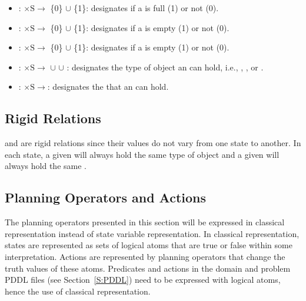 \begin{itemize}
\item {}: $\mathrm{\times S\rightarrow}$ \{0\} $\cup$ \{1\}: designates if a  is full (1) or not (0).

\item {}: $\mathrm{\times S\rightarrow}$ \{0\} $\cup$ \{1\}: designates if a  is empty (1) or not (0).

\item {}: $\mathrm{\times S\rightarrow}$ \{0\} $\cup$ \{1\}: designates if a  is empty (1) or not (0).

\item {}: $\mathrm{\times S \rightarrow}$ $\cup$  $\cup$ : designates the type of object an  can hold, i.e., , , or .

\item {}: $\mathrm{\times S \rightarrow}$: designates the  that an  can hold.
\end{itemize}


\subsection{Rigid Relations}
\label{subsubsect:Rigid_Relation}
 and  are rigid relations since their values do not vary from one state to another. In each state, a given  will always hold the same type of object and a given  will always hold the same .

\subsection{Planning Operators and Actions}
\label{subsect:Planning_Operators}
The planning operators presented in this section will be expressed in classical representation instead of state variable representation. In classical representation, states are represented as sets of logical atoms that are true or false within some interpretation. Actions are represented by planning operators that change the truth values of these atoms. Predicates and actions in the domain and problem PDDL files (see Section~\ref{S:PDDL}) need to be expressed with logical atoms, hence the use of classical representation.


